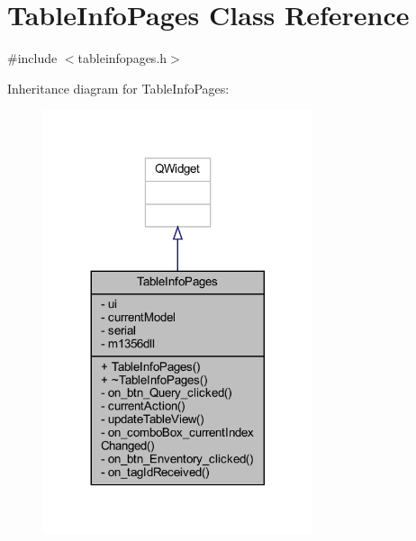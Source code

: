 \hypertarget{class_table_info_pages}{}\section{Table\+Info\+Pages Class Reference}
\label{class_table_info_pages}


{\ttfamily \#include $<$tableinfopages.\+h$>$}



Inheritance diagram for Table\+Info\+Pages\+:
\nopagebreak
\begin{figure}[H]
\begin{center}
\leavevmode
\includegraphics[width=224pt]{class_table_info_pages__inherit__graph}
\end{center}
\end{figure}


